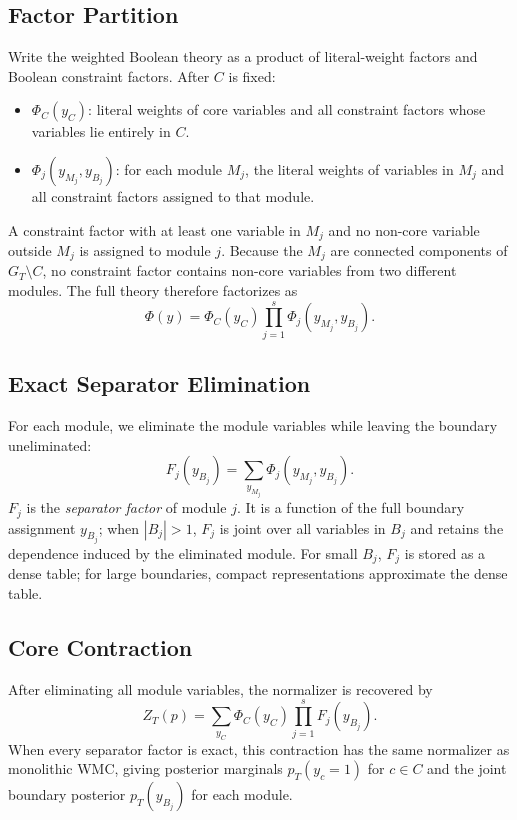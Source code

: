 \documentclass[12pt]{article}
\begin{document}
\subsection{Factor Partition}

Write the weighted Boolean theory as a product of literal-weight factors
and Boolean constraint factors. After $C$ is fixed:
\begin{itemize}
  \item $\Phi_C(y_C)$: literal weights of core variables and all
    constraint factors whose variables lie entirely in $C$.
  \item $\Phi_j(y_{M_j},y_{B_j})$: for each module $M_j$, the literal
    weights of variables in $M_j$ and all constraint factors assigned to
    that module.
\end{itemize}
A constraint factor with at least one variable in $M_j$ and no non-core
variable outside $M_j$ is assigned to module $j$. Because the $M_j$
are connected components of $G_T\setminus C$, no constraint factor
contains non-core variables from two different modules. The full theory
therefore factorizes as
\[
  \Phi(y) = \Phi_C(y_C)\prod_{j=1}^{s}\Phi_j(y_{M_j},y_{B_j}).
\]

\subsection{Exact Separator Elimination}

For each module, we eliminate the module variables while leaving the
boundary uneliminated:
\[
  F_j(y_{B_j}) = \sum_{y_{M_j}} \Phi_j(y_{M_j},y_{B_j}).
\]
$F_j$ is the \emph{separator factor} of module $j$. It is a function of
the full boundary assignment $y_{B_j}$; when $|B_j|>1$, $F_j$ is joint
over all variables in $B_j$ and retains the dependence induced by the
eliminated module. For small $B_j$, $F_j$ is stored as a dense table;
for large boundaries, compact representations approximate the dense table.

\subsection{Core Contraction}

After eliminating all module variables, the normalizer is recovered by
\[
  Z_T(p) = \sum_{y_C} \Phi_C(y_C)\prod_{j=1}^{s} F_j(y_{B_j}).
\]
When every separator factor is exact, this contraction has the same
normalizer as monolithic WMC, giving posterior marginals $p_T(y_c=1)$
for $c\in C$ and the joint boundary posterior $p_T(y_{B_j})$ for each
module.
\end{document}
